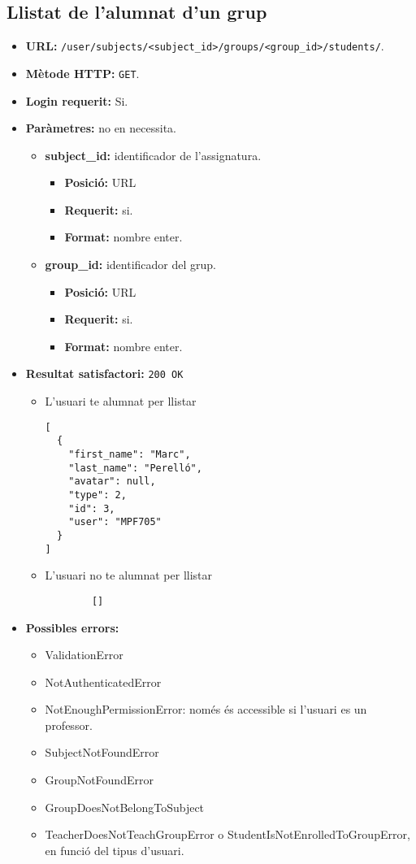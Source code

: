 \subsection{Llistat de l'alumnat d'un grup}
\begin{itemize}
\item \textbf{\ac{URL}: } \texttt{/user/subjects/<subject\_id>/groups/<group\_id>/students/}.
\item \textbf{Mètode \ac{HTTP}: } \texttt{GET}.
\item \textbf{Login requerit:} Si.
\item \textbf{Paràmetres:} no en necessita.
		\begin{itemize}
		\item \textbf{subject\_id:} identificador de l'assignatura.
		\begin{itemize}
			\item \textbf{Posició:} \ac{URL}
			\item \textbf{Requerit:} si.
			\item \textbf{Format:} nombre enter.
		\end{itemize}
		\item \textbf{group\_id:} identificador del grup.
		\begin{itemize}
			\item \textbf{Posició:} \ac{URL}
			\item \textbf{Requerit:} si.
			\item \textbf{Format:} nombre enter.
		\end{itemize}
	\end{itemize}
	
\item \textbf{Resultat satisfactori:} \texttt{200 OK}
	\begin{itemize}
		\item L'usuari te alumnat per llistar
		\begin{verbatim}
[
  {
    "first_name": "Marc",
    "last_name": "Perelló",
    "avatar": null,
    "type": 2,
    "id": 3,
    "user": "MPF705"
  }
]
		\end{verbatim}
		\item L'usuari no te alumnat per llistar
		\begin{verbatim}
		[]
		\end{verbatim}
	\end{itemize}
\item \textbf{Possibles errors:}
	\begin{itemize}
		\item ValidationError
		\item NotAuthenticatedError
		\item NotEnoughPermissionError: només és accessible si l'usuari es un professor.
		\item SubjectNotFoundError
		\item GroupNotFoundError
		\item GroupDoesNotBelongToSubject
		\item TeacherDoesNotTeachGroupError o StudentIsNotEnrolledToGroupError, en funció del tipus d'usuari.
	\end{itemize}
\end{itemize}

